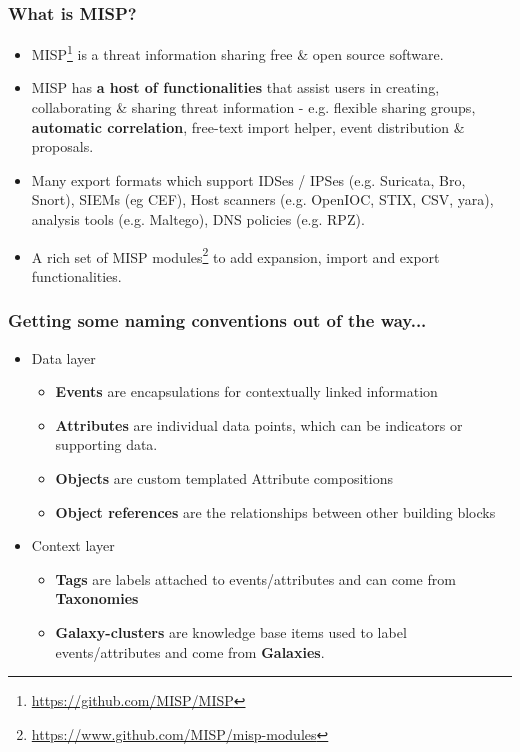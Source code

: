\begin{frame}
 \frametitle{What is MISP?}
 \begin{itemize}
         \item MISP\footnote{\url{https://github.com/MISP/MISP}} is a threat information sharing free \& open source software.
         \item MISP has {\bf a host of functionalities} that assist users in creating, collaborating \& sharing threat information - e.g. flexible sharing groups, {\bf automatic correlation}, free-text import helper, event distribution \& proposals.
         \item Many export formats which support IDSes / IPSes (e.g. Suricata, Bro, Snort), SIEMs (eg CEF), Host scanners (e.g. OpenIOC, STIX, CSV, yara), analysis tools (e.g. Maltego), DNS policies (e.g. RPZ).
         \item A rich set of MISP modules\footnote{\url{https://www.github.com/MISP/misp-modules}} to add expansion, import and export functionalities.
 \end{itemize}
\end{frame}

\begin{frame}
        \frametitle{Getting some naming conventions out of the way...}
         \begin{itemize}
                \item Data layer
                \begin{itemize}
                    \item {\bf Events} are encapsulations for contextually linked information
                    \item {\bf Attributes} are individual data points, which can be indicators or supporting data.
                    \item {\bf Objects} are custom templated Attribute compositions
                    \item {\bf Object references} are the relationships between other building blocks
                \end{itemize}
                \item Context layer
                \begin{itemize}
                    \item {\bf Tags} are labels attached to events/attributes and can come from {\bf Taxonomies}
                    \item {\bf Galaxy-clusters} are knowledge base items used to label events/attributes and come from {\bf Galaxies}. 
                \end{itemize}
        \end{itemize}
\end{frame}

